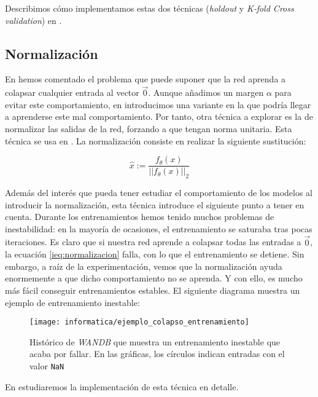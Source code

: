 Describimos cómo implementamos estas dos técnicas (\textit{holdout} y \textit{K-fold Cross validation}) en .

\subsection{Normalización} \label{isubs:normalizacion_teoria}

En  hemos comentado el problema que puede suponer que la red aprenda a colapsar cualquier entrada al vector $\vec{0}$. Aunque añadimos un margen $\alpha$ para evitar este comportamiento, en  introducimos una variante en la que podría llegar a aprenderse este mal comportamiento. Por tanto, otra técnica a explorar es la de normalizar las salidas de la red, forzando a que tengan norma unitaria. Esta técnica se usa en \cite{informatica:facenet}. La normalización consiste en realizar la siguiente sustitución:

\begin{equation} \label{ieq:normalizacion}
    \hat{x} := \frac{f_{\theta}(x)}{||f_{\theta}(x)||_2}
\end{equation}

Además del interés que pueda tener estudiar el comportamiento de los modelos al introducir la normalización, esta técnica introduce el siguiente punto a tener en cuenta. Durante los entrenamientos hemos tenido muchos problemas de inestabilidad:  en la mayoría de ocasiones, el entrenamiento se saturaba tras pocas iteraciones. Es claro que si nuestra red aprende a colapsar todas las entradas a $\vec{0}$, la ecuación \eqref{ieq:normalizacion} falla, con lo que el entrenamiento se detiene. Sin embargo, a raíz de la experimentación, vemos que la normalización ayuda enormemente a que dicho comportamiento no se aprenda. Y con ello, es mucho más fácil conseguir entrenamientos estables. El siguiente diagrama muestra un ejemplo de entrenamiento inestable:

\begin{figure}[H]
    \centering
    \texttt{[image: informatica/ejemplo\_colapso\_entrenamiento]}
    \caption{Histórico de \textit{WANDB} que muestra un entrenamiento inestable que acaba por fallar. En las gráficas, los círculos indican entradas con el valor \lstinline{NaN}}
\end{figure}

En  estudiaremos la implementación de esta técnica en detalle.

